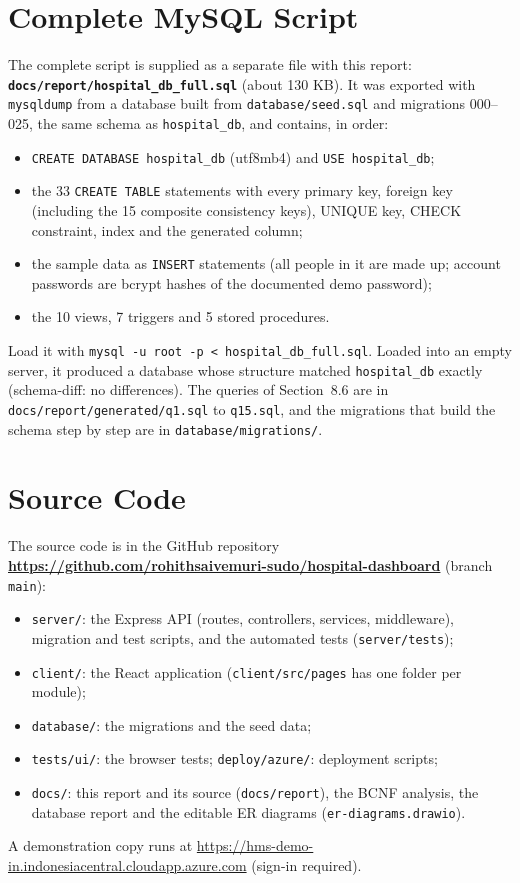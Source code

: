 \chapter{Complete MySQL Script}
The complete script is supplied as a separate file with this report: \textbf{\texttt{docs/report/hospital\_db\_full.sql}}
(about 130 KB). It was exported with \texttt{mysqldump} from a database built from \texttt{database/seed.sql} and
migrations 000--025, the same schema as \texttt{hospital\_db}, and contains, in order:
\begin{itemize}
\item \texttt{CREATE DATABASE hospital\_db} (utf8mb4) and \texttt{USE hospital\_db};
\item the 33 \texttt{CREATE TABLE} statements with every primary key, foreign key (including the 15 composite consistency keys), UNIQUE key, CHECK constraint, index and the generated column;
\item the sample data as \texttt{INSERT} statements (all people in it are made up; account passwords are bcrypt hashes of the documented demo password);
\item the 10 views, 7 triggers and 5 stored procedures.
\end{itemize}
Load it with \texttt{mysql -u root -p < hospital\_db\_full.sql}. Loaded into an empty server, it produced a database
whose structure matched \texttt{hospital\_db} exactly (schema-diff: no differences). The queries of Section~8.6 are in
\texttt{docs/report/generated/q1.sql} to \texttt{q15.sql}, and the migrations that build the schema step by step are in
\texttt{database/migrations/}.

\chapter{Source Code}
The source code is in the GitHub repository
\textbf{\url{https://github.com/rohithsaivemuri-sudo/hospital-dashboard}} (branch \texttt{main}):
\begin{itemize}
\item \texttt{server/}: the Express API (routes, controllers, services, middleware), migration and test scripts, and the automated tests (\texttt{server/tests});
\item \texttt{client/}: the React application (\texttt{client/src/pages} has one folder per module);
\item \texttt{database/}: the migrations and the seed data;
\item \texttt{tests/ui/}: the browser tests; \texttt{deploy/azure/}: deployment scripts;
\item \texttt{docs/}: this report and its source (\texttt{docs/report}), the BCNF analysis, the database report and the editable ER diagrams (\texttt{er-diagrams.drawio}).
\end{itemize}
A demonstration copy runs at \url{https://hms-demo-in.indonesiacentral.cloudapp.azure.com} (sign-in required).

